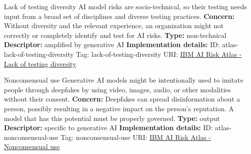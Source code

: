 \begin{definitionbox}{Lack of testing diversity}
AI model risks are socio-technical, so their testing needs input from a broad set of disciplines and diverse testing practices.\newline\newline
\textbf{Concern: }Without diversity and the relevant experience, an organization might not correctly or completely identify and test for AI risks.\newline\newline
\textbf{Type: }non-technical\newline
\textbf{Descriptor: }amplified by generative AI \newline\newline
\textbf{Implementation details: } \newline
ID: atlas-lack-of-testing-diversity \newline
Tag: lack-of-testing-diversity \newline
URI:  \href{https://www.ibm.com/docs/en/watsonx/saas?topic=SSYOK8/wsj/ai-risk-atlas/lack-of-testing-diversity.html}{IBM AI Risk Atlas - Lack of testing diversity}\newline
\end{definitionbox}
\begin{definitionbox}{Nonconsensual use}
Generative AI models might be intentionally used to imitate people through deepfakes by using video, images, audio, or other modalities without their consent.\newline\newline
\textbf{Concern: }Deepfakes can spread disinformation about a person, possibly resulting in a negative impact on the person's reputation. A model that has this potential must be properly governed.\newline\newline
\textbf{Type: }output\newline
\textbf{Descriptor: }specific to generative AI \newline\newline
\textbf{Implementation details: } \newline
ID: atlas-nonconsensual-use \newline
Tag: nonconsensual-use \newline
URI:  \href{https://www.ibm.com/docs/en/watsonx/saas?topic=SSYOK8/wsj/ai-risk-atlas/nonconsensual-use.html}{IBM AI Risk Atlas - Nonconsensual use}\newline
\end{definitionbox}
